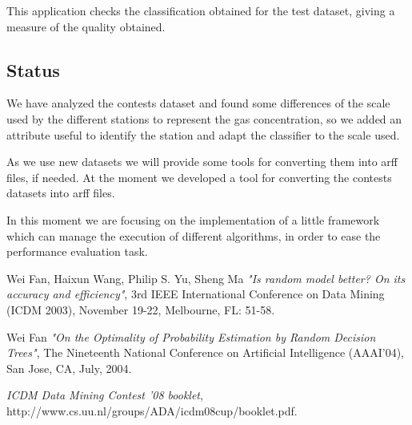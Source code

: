 \documentclass[12pt,a4paper]{article}
\begin{document}
This application checks the classification obtained for the test dataset,
giving a measure of the quality obtained.

\subsection*{Status}
We have analyzed the contests dataset and found some differences of the
scale used by the different stations to represent the gas concentration,
so we added an attribute useful to identify the station and adapt the
classifier to the scale used.

As we use new datasets we will provide some tools for converting them into
arff files, if needed. At the moment we developed a tool for converting
the contests datasets into arff files.

In this moment we are focusing on the implementation of a little framework
which can manage the execution of different algorithms, in order to ease
the performance evaluation task.

\begin{thebibliography}{9}
 Wei Fan, Haixun Wang, Philip S. Yu, Sheng Ma  \emph{"Is
random model better? On its accuracy and efficiency"},  3rd IEEE
International Conference on Data Mining (ICDM 2003), November 19-22,
Melbourne, FL: 51-58. 

 Wei Fan  \emph{"On the Optimality of Probability Estimation
by Random Decision Trees"},  The Nineteenth National Conference on
Artificial Intelligence (AAAI'04), San Jose, CA, July, 2004.

 \emph{ICDM Data Mining Contest '08 booklet},\\
 http://www.cs.uu.nl/groups/ADA/icdm08cup/booklet.pdf.

\end{thebibliography}
\end{document}
